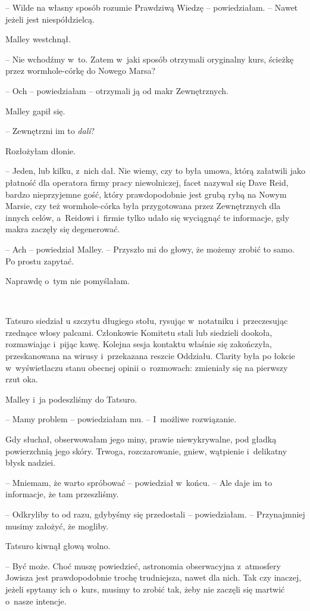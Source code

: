 \documentclass[oneside,polish,11pt,sfheadings]{mwbk}
\begin{document}
-- Wilde na własny sposób rozumie Prawdziwą
Wiedzę -- powiedziałam. -- Nawet jeżeli jest niespółdzielcą.

Malley westchnął. 

-- Nie wchodźmy w~to. Zatem w~jaki sposób otrzymali
oryginalny kurs, ścieżkę przez wormhole-córkę do Nowego Marsa?

-- Och -- powiedziałam -- otrzymali ją od makr Zewnętrznych.

Malley gapił się. 

-- Zewnętrzni im to \textit{dali}?

Rozłożyłam dłonie. 

-- Jeden, lub kilku, z~nich dał. Nie wiemy, czy to
była umowa, którą załatwili jako płatność dla operatora firmy pracy
niewolniczej, facet nazywał się Dave Reid, bardzo nieprzyjemne gość,
który prawdopodobnie jest grubą rybą na Nowym Marsie, czy też
wormhole-córka była przygotowana przez Zewnętrznych dla innych celów, a~Reidowi i~firmie tylko udało się wyciągnąć te informacje, gdy makra
zaczęły się degenerować.

-- Ach -- powiedział Malley. -- Przyszło mi do głowy, że możemy zrobić to
samo. Po prostu zapytać.

Naprawdę o~tym nie pomyślałam.

~

Tatsuro siedział u szczytu długiego stołu, rysując w~notatniku i~przeczesując rzednące włosy palcami. Członkowie Komitetu stali lub
siedzieli dookoła, rozmawiając i~pijąc kawę. Kolejna sesja kontaktu
właśnie się zakończyła, przeskanowana na wirusy i~przekazana reszcie
Oddziału. Clarity była po łokcie w~wyświetlaczu stanu obecnej opinii o~rozmowach: zmieniały się na pierwszy rzut oka.

Malley i~ja podeszliśmy do Tatsuro.

-- Mamy problem -- powiedziałam mu. -- I~możliwe rozwiązanie.

Gdy słuchał, obserwowałam jego miny, prawie niewykrywalne, pod gładką
powierzchnią jego skóry. Trwoga, rozczarowanie, gniew, wątpienie i~delikatny błysk nadziei.

-- Mniemam, że warto spróbować -- powiedział w~końcu. -- Ale daje im to
informacje, że tam przeszliśmy.

-- Odkryliby to od razu, gdybyśmy się przedostali -- powiedziałam. -- Przynajmniej musimy założyć, że mogliby.

Tatsuro kiwnął głową wolno. 

-- Być może. Choć muszę powiedzieć,
astronomia obserwacyjna z~atmosfery Jowisza jest prawdopodobnie trochę
trudniejsza, nawet dla nich. Tak czy inaczej, jeżeli spytamy ich o~kurs,
musimy to zrobić tak, żeby nie zaczęli się martwić o~nasze intencje.
\end{document}
